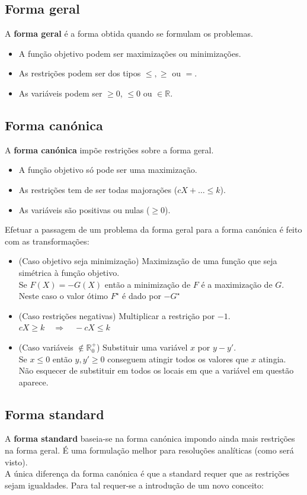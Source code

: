 \documentclass[]{report}
\begin{document}
\subsection{Forma geral}
A \textbf{forma geral} é a forma obtida quando se formulam os problemas.
\begin{itemize}
\item A função objetivo podem ser maximizações ou minimizações.
\item As restrições podem ser dos tipos $\leq, \geq$ ou $=$.
\item As variáveis podem ser $\geq 0$, $\leq 0$ ou $\in \mathbb{R}$.
\end{itemize}
\subsection{Forma canónica}
A \textbf{forma canónica} impõe restrições sobre a forma geral.
\begin{itemize}
\item A função objetivo só pode ser uma maximização.
\item As restrições tem de ser todas majorações ($cX + \dots  \leq k$).
\item As variáveis são positivas ou nulas ($\geq 0$).
\end{itemize}
Efetuar a passagem de um problema da forma geral para a forma canónica é feito com as transformações:
\begin{itemize}
\item (Caso objetivo seja minimização) Maximização de uma função que seja simétrica à função objetivo.\\
Se $F(X)=-G(X)$ então a minimização de $F$ é a maximização de $G$.\\
Neste caso o valor ótimo $F^\star$ é dado por $-G^\star$
\item (Caso restrições negativas) Multiplicar a restrição por $-1$.\\
$cX \geq k \quad \Rightarrow \quad -cX \leq k$
\item (Caso variáveis $\notin \mathbb{R}^+_0$) Substituir uma variável $x$ por $y-y'$.\\
Se $x \leq 0$ então $y,y' \geq 0$ conseguem atingir todos os valores que $x$ atingia.\\
Não esquecer de substituir em todos os locais em que a variável em questão aparece.
\end{itemize}
\subsection{Forma standard}
A \textbf{forma standard} baseia-se na forma canónica impondo ainda mais restrições na forma geral. É uma formulação melhor para resoluções analíticas (como será visto).\\[0.5cm]
A única diferença da forma canónica é que a standard requer que as restrições sejam igualdades. Para tal requer-se a introdução de um novo conceito:
\end{document}
